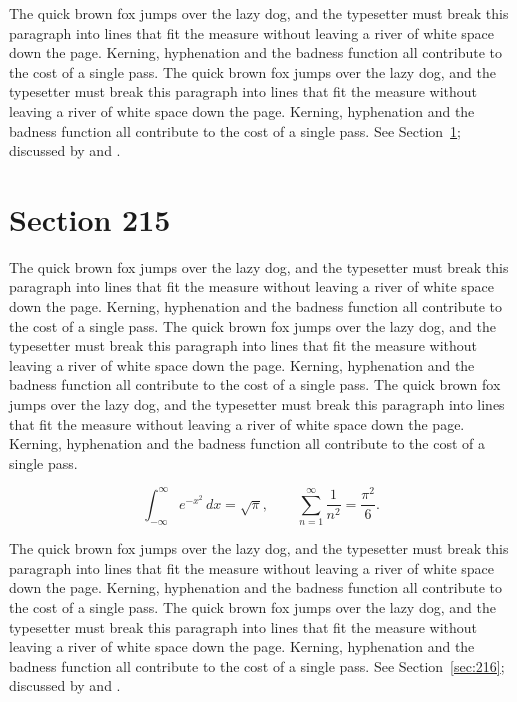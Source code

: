 \documentclass{article}
\begin{document}
The quick brown fox jumps over the lazy dog, and the typesetter must break this paragraph into lines that fit the measure without leaving a river of white space down the page. Kerning, hyphenation and the badness function all contribute to the cost of a single pass. The quick brown fox jumps over the lazy dog, and the typesetter must break this paragraph into lines that fit the measure without leaving a river of white space down the page. Kerning, hyphenation and the badness function all contribute to the cost of a single pass. 
See Section~\ref{sec:215}; discussed by \textcite{k5} and \textcite{l2}.
\section{Section 215}
\label{sec:215}
The quick brown fox jumps over the lazy dog, and the typesetter must break this paragraph into lines that fit the measure without leaving a river of white space down the page. Kerning, hyphenation and the badness function all contribute to the cost of a single pass. The quick brown fox jumps over the lazy dog, and the typesetter must break this paragraph into lines that fit the measure without leaving a river of white space down the page. Kerning, hyphenation and the badness function all contribute to the cost of a single pass. The quick brown fox jumps over the lazy dog, and the typesetter must break this paragraph into lines that fit the measure without leaving a river of white space down the page. Kerning, hyphenation and the badness function all contribute to the cost of a single pass. 

\begin{equation}\label{eq:215}
\int_{-\infty}^{\infty} e^{-x^{2}}\,dx = \sqrt{\pi}, \qquad
\sum_{n=1}^{\infty} \frac{1}{n^{2}} = \frac{\pi^{2}}{6}.
\end{equation}

The quick brown fox jumps over the lazy dog, and the typesetter must break this paragraph into lines that fit the measure without leaving a river of white space down the page. Kerning, hyphenation and the badness function all contribute to the cost of a single pass. The quick brown fox jumps over the lazy dog, and the typesetter must break this paragraph into lines that fit the measure without leaving a river of white space down the page. Kerning, hyphenation and the badness function all contribute to the cost of a single pass. 
See Section~\ref{sec:216}; discussed by \textcite{k1} and \textcite{l3}.
\end{document}
